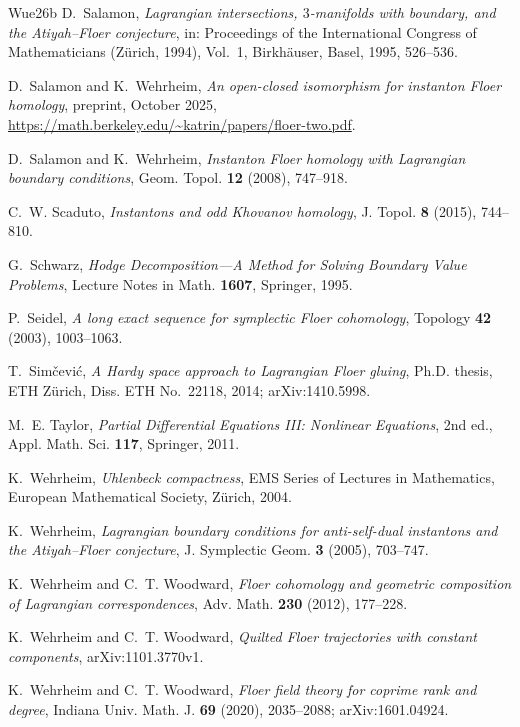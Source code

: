 \documentclass[11pt]{amsart}
\theoremstyle{definition}
\theoremstyle{remark}
\theoremstyle{plain}
\numberwithin{equation}{section}
\begin{document}
\begin{thebibliography}{Wue26b}
D.~Salamon, \emph{Lagrangian intersections, $3$-manifolds with boundary, and
the Atiyah--Floer conjecture}, in: Proceedings of the International Congress
of Mathematicians (Z\"urich, 1994), Vol.~1, Birkh\"auser, Basel, 1995,
526--536.

D.~Salamon and K.~Wehrheim, \emph{An open-closed isomorphism for instanton
Floer homology}, preprint, October 2025,
\url{https://math.berkeley.edu/~katrin/papers/floer-two.pdf}.

D.~Salamon and K.~Wehrheim, \emph{Instanton Floer homology with Lagrangian
boundary conditions}, Geom. Topol. \textbf{12} (2008), 747--918.

C.~W. Scaduto, \emph{Instantons and odd Khovanov homology}, J. Topol.
\textbf{8} (2015), 744--810.

G.~Schwarz, \emph{Hodge Decomposition---A Method for Solving Boundary
Value Problems}, Lecture Notes in Math. \textbf{1607}, Springer, 1995.

P.~Seidel, \emph{A long exact sequence for symplectic Floer cohomology},
Topology \textbf{42} (2003), 1003--1063.

T.~Sim\v{c}evi\'c, \emph{A Hardy space approach to Lagrangian Floer gluing},
Ph.D. thesis, ETH Z\"urich, Diss. ETH No.~22118, 2014; arXiv:1410.5998.

M.~E. Taylor, \emph{Partial Differential Equations III: Nonlinear Equations},
2nd ed., Appl. Math. Sci. \textbf{117}, Springer, 2011.

K.~Wehrheim, \emph{Uhlenbeck compactness}, EMS Series of Lectures in
Mathematics, European Mathematical Society, Z\"urich, 2004.

K.~Wehrheim, \emph{Lagrangian boundary conditions for anti-self-dual
instantons and the Atiyah--Floer conjecture}, J. Symplectic Geom.
\textbf{3} (2005), 703--747.

K.~Wehrheim and C.~T. Woodward, \emph{Floer cohomology and geometric
composition of Lagrangian correspondences}, Adv. Math. \textbf{230}
(2012), 177--228.

K.~Wehrheim and C.~T. Woodward, \emph{Quilted Floer trajectories with
constant components}, arXiv:1101.3770v1.

K.~Wehrheim and C.~T. Woodward, \emph{Floer field theory for coprime rank
and degree}, Indiana Univ. Math. J. \textbf{69} (2020), 2035--2088;
arXiv:1601.04924.


\end{thebibliography}
\end{document}
